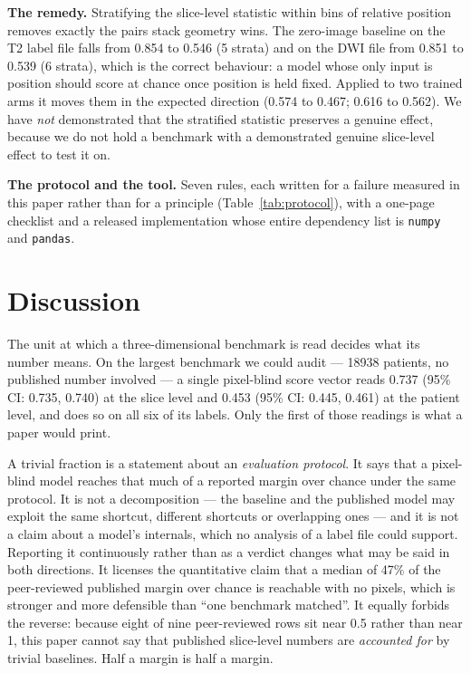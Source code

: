 \documentclass[11pt,a4paper]{article}
\begin{document}
\textbf{The remedy.} Stratifying the slice-level statistic within bins of
relative position removes exactly the pairs stack geometry wins. The zero-image
baseline on the T2 label file falls from 0.854 to 0.546 (5 strata) and on the DWI
file from 0.851 to 0.539 (6 strata), which is the correct behaviour: a model
whose only input is position should score at chance once position is held fixed.
Applied to two trained arms it moves them in the expected direction (0.574 to
0.467; 0.616 to 0.562). We have \emph{not} demonstrated that the stratified
statistic preserves a genuine effect, because we do not hold a benchmark with a
demonstrated genuine slice-level effect to test it on.

\textbf{The protocol and the tool.} Seven rules, each written for a failure
measured in this paper rather than for a principle (Table~\ref{tab:protocol}),
with a one-page checklist and a released implementation whose entire dependency
list is \texttt{numpy} and \texttt{pandas}.

\section{Discussion}

The unit at which a three-dimensional benchmark is read decides what its number
means. On the largest benchmark we could audit --- \num{18938} patients, no
published number involved --- a single pixel-blind score vector reads 0.737 (95\%
CI: 0.735, 0.740) at the slice level and 0.453 (95\% CI: 0.445, 0.461) at the
patient level, and does so on all six of its labels. Only the first of those
readings is what a paper would print.

A trivial fraction is a statement about an \emph{evaluation protocol}. It says
that a pixel-blind model reaches that much of a reported margin over chance under
the same protocol. It is not a decomposition --- the baseline and the published
model may exploit the same shortcut, different shortcuts or overlapping ones ---
and it is not a claim about a model's internals, which no analysis of a label
file could support. Reporting it continuously rather than as a verdict changes
what may be said in both directions. It licenses the quantitative claim that a
median of 47\% of the peer-reviewed published margin over chance is reachable
with no pixels, which is stronger and more defensible than ``one benchmark
matched''. It equally forbids the reverse: because eight of nine peer-reviewed
rows sit near 0.5 rather than near 1, this paper cannot say that published
slice-level numbers are \emph{accounted for} by trivial baselines. Half a margin
is half a margin.
\end{document}

